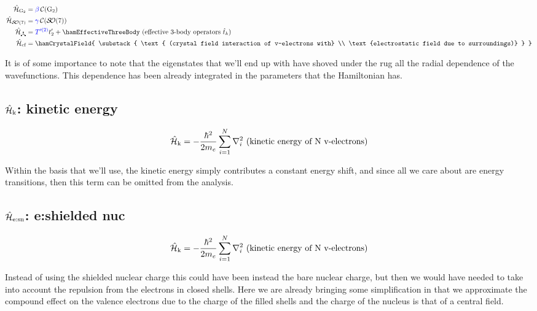 \documentclass{article}
\begin{document}
\begin{align}
	\hamGTwoSymbol      &= \casimirBeta\casimir{\text{G}_2} \\
	\hamSOSevenSymbol   &= \casimirGamma\casimir{\SO{7}} \\
	\ham_{\trispoke} &= {\opcolor{T'^{(2)}}}t'_2 + \hamEffectiveThreeBody \text{ (effective 3-body operators $\op{t}_k$)} \\
	\hamCrystalFieldSymbol &= \hamCrystalField {   
		\substack{
			\text{ (crystal field interaction of v-electrons with} \\
			\text{electrostatic field due to surroundings)}
			} 
			}\\
\end{align} 

It is of some importance to note that the eigenstates that we'll end up with have shoved under the rug all the radial dependence of the wavefunctions. This dependence has been already integrated in the parameters that the Hamiltonian has. 

\subsection{$\hat{\mathcal{H}}_\text{k}$: kinetic energy}

\begin{equation}
    \hat{\mathcal{H}}_\text{k} = -\frac{\hbar^2}{2m_e}\sum_{i=1}^N \nabla_i^2 \text{ (kinetic energy of N v-electrons)}
\end{equation}

Within the basis that we'll use, the kinetic energy simply contributes a constant energy shift, and since all we care about are energy transitions, then this term can be omitted from the analysis.

\subsection{$\hat{\mathcal{H}}_\text{e:sn}$: e:shielded nuc}

\begin{equation}
\hat{\mathcal{H}}_\text{k} = -\frac{\hbar^2}{2m_e}\sum_{i=1}^N \nabla_i^2 \text{ (kinetic energy of N v-electrons)}
\end{equation}

Instead of using the shielded nuclear charge this could have been instead the bare nuclear charge, but then we would have needed to take into account the repulsion from the electrons in closed shells. Here we are already bringing some simplification in that we approximate the compound effect on the valence electrons due to the charge of the filled shells and the charge of the nucleus is that of a central field. 
\end{document}
